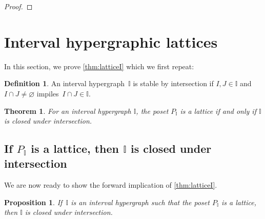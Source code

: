 \documentclass[reqno]{amsart}
\newtheorem{theoremA}{Theorem}
\newtheorem{proposition}[theorem]{Proposition}
\theoremstyle{definition}
\newtheorem{definition}[theorem]{Definition}
\newcommand{\II}{\mathbb I} %
\begin{document}
\begin{proof}
\end{proof}


\section{Interval hypergraphic lattices}
\label{sec:LatticePI}

In this section, we prove \cref{thm:latticeI} which we first repeat: %

\begin{definition}
An interval hypergraph~$\II$ is stable by intersection if $I, J \in \II$ and~$I \cap J \ne \varnothing$ impiles~$I \cap J \in \II$.
\end{definition}

\begin{theoremA}
For an interval hypergraph $\II$, the poset $P_\II$ is a lattice if and only if $\II$ is closed under intersection.
\end{theoremA}


\subsection{If $P_\II$ is a lattice, then $\II$ is closed under intersection}  
\label{subsec:latticeForward}

We are now ready to show the forward implication of \cref{thm:latticeI}.

\begin{proposition}
\label{prop:latticeForward}
If~$\II$ is an interval  hypergraph such that the poset $P_\II$ is a lattice, then $\II$ is closed under intersection.
\end{proposition}
\end{document}
